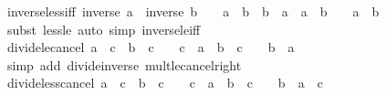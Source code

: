 \begin{isabellebody}
\endisatagproof
{\isafoldproof}%
%
\isadelimproof
\isanewline
%
\endisadelimproof
\isanewline
{}\isamarkupfalse%
\ inverse{\isacharunderscore}{\kern0pt}less{\isacharunderscore}{\kern0pt}iff{\isacharcolon}{\kern0pt}\ {\isachardoublequoteopen}inverse\ a\ {\isacharless}{\kern0pt}\ inverse\ b\ {\isasymlongleftrightarrow}\ {\isacharparenleft}{\kern0pt}{}\ {\isacharless}{\kern0pt}\ a\ {\isacharasterisk}{\kern0pt}\ b\ {\isasymlongrightarrow}\ b\ {\isacharless}{\kern0pt}\ a{\isacharparenright}{\kern0pt}\ {\isasymand}\ {\isacharparenleft}{\kern0pt}a\ {\isacharasterisk}{\kern0pt}\ b\ {\isasymle}\ {}\ {\isasymlongrightarrow}\ a\ {\isacharless}{\kern0pt}\ b{\isacharparenright}{\kern0pt}{\isachardoublequoteclose}\isanewline
%
\isadelimproof
\ \ %
\endisadelimproof
%
\isatagproof
{}\isamarkupfalse%
\ {\isacharparenleft}{\kern0pt}subst\ less{\isacharunderscore}{\kern0pt}le{\isacharparenright}{\kern0pt}\ {\isacharparenleft}{\kern0pt}auto\ simp{\isacharcolon}{\kern0pt}\ inverse{\isacharunderscore}{\kern0pt}le{\isacharunderscore}{\kern0pt}iff{\isacharparenright}{\kern0pt}%
\endisatagproof
{\isafoldproof}%
%
\isadelimproof
\isanewline
%
\endisadelimproof
\isanewline
{}\isamarkupfalse%
\ divide{\isacharunderscore}{\kern0pt}le{\isacharunderscore}{\kern0pt}cancel{\isacharcolon}{\kern0pt}\ {\isachardoublequoteopen}a\ {\isacharslash}{\kern0pt}\ c\ {\isasymle}\ b\ {\isacharslash}{\kern0pt}\ c\ {\isasymlongleftrightarrow}\ {\isacharparenleft}{\kern0pt}{}\ {\isacharless}{\kern0pt}\ c\ {\isasymlongrightarrow}\ a\ {\isasymle}\ b{\isacharparenright}{\kern0pt}\ {\isasymand}\ {\isacharparenleft}{\kern0pt}c\ {\isacharless}{\kern0pt}\ {}\ {\isasymlongrightarrow}\ b\ {\isasymle}\ a{\isacharparenright}{\kern0pt}{\isachardoublequoteclose}\isanewline
%
\isadelimproof
\ \ %
\endisadelimproof
%
\isatagproof
{}\isamarkupfalse%
\ {\isacharparenleft}{\kern0pt}simp\ add{\isacharcolon}{\kern0pt}\ divide{\isacharunderscore}{\kern0pt}inverse\ mult{\isacharunderscore}{\kern0pt}le{\isacharunderscore}{\kern0pt}cancel{\isacharunderscore}{\kern0pt}right{\isacharparenright}{\kern0pt}%
\endisatagproof
{\isafoldproof}%
%
\isadelimproof
\isanewline
%
\endisadelimproof
\isanewline
{}\isamarkupfalse%
\ divide{\isacharunderscore}{\kern0pt}less{\isacharunderscore}{\kern0pt}cancel{\isacharcolon}{\kern0pt}\ {\isachardoublequoteopen}a\ {\isacharslash}{\kern0pt}\ c\ {\isacharless}{\kern0pt}\ b\ {\isacharslash}{\kern0pt}\ c\ {\isasymlongleftrightarrow}\ {\isacharparenleft}{\kern0pt}{}\ {\isacharless}{\kern0pt}\ c\ {\isasymlongrightarrow}\ a\ {\isacharless}{\kern0pt}\ b{\isacharparenright}{\kern0pt}\ {\isasymand}\ {\isacharparenleft}{\kern0pt}c\ {\isacharless}{\kern0pt}\ {}\ {\isasymlongrightarrow}\ b\ {\isacharless}{\kern0pt}\ a{\isacharparenright}{\kern0pt}\ {\isasymand}\ c\ {\isasymnoteq}\ {}{\isachardoublequoteclose}\isanewline

\end{isabellebody}
